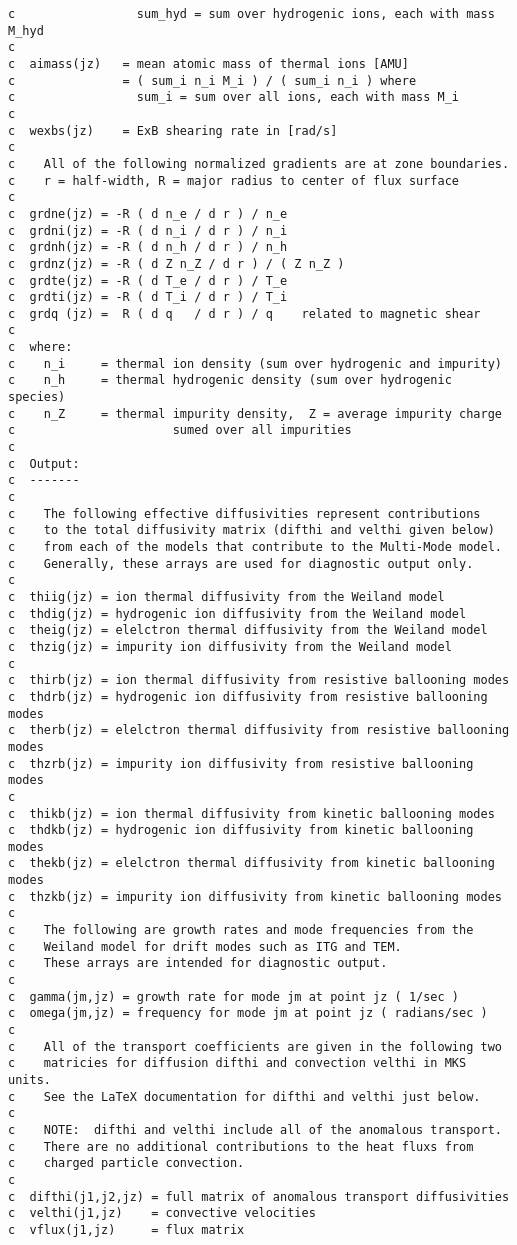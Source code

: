 \begin{verbatim}
c                 sum_hyd = sum over hydrogenic ions, each with mass M_hyd
c
c  aimass(jz)   = mean atomic mass of thermal ions [AMU]
c               = ( sum_i n_i M_i ) / ( sum_i n_i ) where
c                 sum_i = sum over all ions, each with mass M_i
c
c  wexbs(jz)    = ExB shearing rate in [rad/s]
c
c    All of the following normalized gradients are at zone boundaries.
c    r = half-width, R = major radius to center of flux surface
c
c  grdne(jz) = -R ( d n_e / d r ) / n_e
c  grdni(jz) = -R ( d n_i / d r ) / n_i
c  grdnh(jz) = -R ( d n_h / d r ) / n_h
c  grdnz(jz) = -R ( d Z n_Z / d r ) / ( Z n_Z )
c  grdte(jz) = -R ( d T_e / d r ) / T_e
c  grdti(jz) = -R ( d T_i / d r ) / T_i
c  grdq (jz) =  R ( d q   / d r ) / q    related to magnetic shear
c
c  where:
c    n_i     = thermal ion density (sum over hydrogenic and impurity)
c    n_h     = thermal hydrogenic density (sum over hydrogenic species)
c    n_Z     = thermal impurity density,  Z = average impurity charge
c                      sumed over all impurities
c
c  Output:
c  -------
c
c    The following effective diffusivities represent contributions
c    to the total diffusivity matrix (difthi and velthi given below)
c    from each of the models that contribute to the Multi-Mode model.
c    Generally, these arrays are used for diagnostic output only.
c
c  thiig(jz) = ion thermal diffusivity from the Weiland model
c  thdig(jz) = hydrogenic ion diffusivity from the Weiland model
c  theig(jz) = elelctron thermal diffusivity from the Weiland model
c  thzig(jz) = impurity ion diffusivity from the Weiland model
c	    
c  thirb(jz) = ion thermal diffusivity from resistive ballooning modes
c  thdrb(jz) = hydrogenic ion diffusivity from resistive ballooning modes
c  therb(jz) = elelctron thermal diffusivity from resistive ballooning modes
c  thzrb(jz) = impurity ion diffusivity from resistive ballooning modes
c	    
c  thikb(jz) = ion thermal diffusivity from kinetic ballooning modes
c  thdkb(jz) = hydrogenic ion diffusivity from kinetic ballooning modes
c  thekb(jz) = elelctron thermal diffusivity from kinetic ballooning modes
c  thzkb(jz) = impurity ion diffusivity from kinetic ballooning modes
c
c    The following are growth rates and mode frequencies from the
c    Weiland model for drift modes such as ITG and TEM.
c    These arrays are intended for diagnostic output.
c
c  gamma(jm,jz) = growth rate for mode jm at point jz ( 1/sec )
c  omega(jm,jz) = frequency for mode jm at point jz ( radians/sec )
c
c    All of the transport coefficients are given in the following two
c    matricies for diffusion difthi and convection velthi in MKS units.
c    See the LaTeX documentation for difthi and velthi just below.
c
c    NOTE:  difthi and velthi include all of the anomalous transport.
c    There are no additional contributions to the heat fluxs from
c    charged particle convection.
c
c  difthi(j1,j2,jz) = full matrix of anomalous transport diffusivities
c  velthi(j1,jz)    = convective velocities
c  vflux(j1,jz)     = flux matrix
\end{verbatim}

